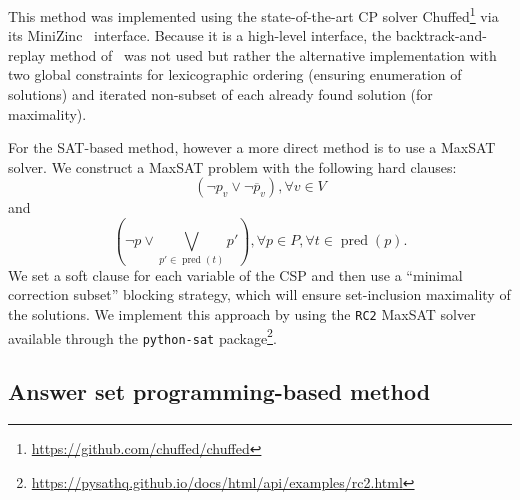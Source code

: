 \documentclass[preprint,12pt]{elsarticle}
\DeclareMathOperator{\pred}{pred}
\begin{document}
This method was implemented using the state-of-the-art CP solver Chuffed\footnote{\url{https://github.com/chuffed/chuffed}} \cite{demirovic2018solution} via its MiniZinc~\cite{nethercote2007minizinc} interface.
Because it is a high-level interface, the backtrack-and-replay method of~\cite{nabli2016enumerating} was not used but rather the alternative implementation with two global constraints for lexicographic ordering (ensuring enumeration of solutions) and iterated non-subset of each already found solution (for maximality).

For the SAT-based method, however a more direct method is to use a MaxSAT solver.
We construct a MaxSAT problem with the following hard clauses:
\[
  (\neg p_v \vee \neg \overline{p}_v), \forall v \in V
\]
and
\[
  (\neg p \vee \bigvee_{p' \in \pred(t)}p'), \forall p \in P, \forall t \in \pred(p).
\]
We set a soft clause for each variable of the CSP and then use a ``minimal correction subset'' blocking strategy, which will ensure set-inclusion maximality of the solutions.
We implement this approach by using the \texttt{RC2} MaxSAT solver~\cite{DBLP:journals/jsat/IgnatievMM19} available through the \texttt{python-sat} package\footnote{\url{https://pysathq.github.io/docs/html/api/examples/rc2.html}}.

\subsection{Answer set programming-based method}%
\label{subsec:computation_asp}
\end{document}
